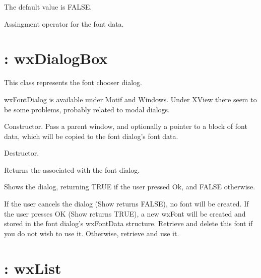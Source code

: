 The default value is FALSE.



Assingment operator for the font data.


\section{: wxDialogBox}\label{wxfontdialog}


This class represents the font chooser dialog.

wxFontDialog is available under Motif and Windows. Under XView there
seem to be some problems, probably related to modal dialogs.



Constructor. Pass a parent window, and optionally a pointer to a block of font
data, which will be copied to the font dialog's font data.



Destructor.



Returns the  associated with the font dialog.



Shows the dialog, returning TRUE if the user pressed Ok, and FALSE
otherwise.

If the user cancels the dialog (Show returns FALSE), no font will be
created. If the user presses OK (Show returns TRUE), a new wxFont will
be created and stored in the font dialog's wxFontData structure.
Retrieve and delete this font if you do not wish to use it. Otherwise,
retrieve and use it.

\section{: wxList}\label{wxfontlist}

